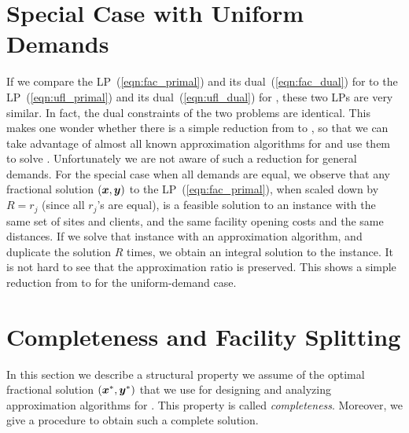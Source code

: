 \documentclass[oneside,final]{ucr}
\begin{document}

\section{Special Case with Uniform Demands}
\label{sec:ftfp_uniform_demand}

If we compare the LP~(\ref{eqn:fac_primal}) and its
dual~(\ref{eqn:fac_dual}) for {\FTFP} to the
LP~(\ref{eqn:ufl_primal}) and its dual~(\ref{eqn:ufl_dual})
for {\UFL}, these two LPs are very similar. In fact, the
dual constraints of the two problems are identical. This
makes one wonder whether there is a simple reduction from
{\FTFP} to {\UFL}, so that we can take advantage of almost
all known approximation algorithms for {\UFL} and use them
to solve {\FTFP}. Unfortunately we are not aware of such a
reduction for general demands. For the special case when all
demands are equal, we observe that any fractional solution
$(\boldsymbol{x},\boldsymbol{y})$ to the LP~(\ref{eqn:fac_primal}), when scaled
down by $R = r_j$ (since all $r_j$'s are equal), is a
feasible solution to an {\UFL} instance with the same set of
sites and clients, and the same facility opening costs and
the same distances. If we solve that {\UFL} instance with an
approximation algorithm, and duplicate the solution $R$
times, we obtain an integral solution to the {\FTFP}
instance. It is not hard to see that the approximation ratio
is preserved. This shows a simple reduction from {\FTFP} to
{\UFL} for the uniform-demand case.

\section{Completeness and Facility Splitting}
\label{sec:ftfp_complete}
In this section we describe a structural property we assume
of the optimal fractional solution $(\boldsymbol{x}^\ast, \boldsymbol{y}^\ast)$
that we use for designing and analyzing approximation
algorithms for {\FTFP}. This property is called
\emph{completeness}. Moreover, we give a procedure to obtain
such a complete solution.
\end{document}
